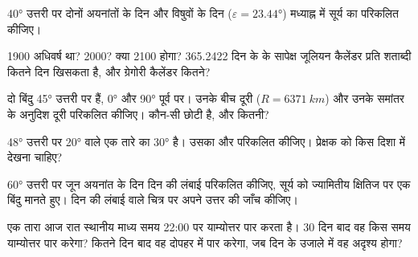 \begin{exercise}[$\star$]\label{exo:b1:spherical-astronomy:3}
\ang{40} उत्तरी  पर दोनों अयनांतों के दिन और विषुवों के दिन ($\varepsilon = \ang{23.44}$)
मध्याह्न में सूर्य का  परिकलित कीजिए।
\end{exercise}

\begin{exercise}[$\star$]\label{exo:b1:spherical-astronomy:4}
1900 अधिवर्ष था? 2000? क्या 2100 होगा? 365.2422 दिन के  के सापेक्ष जूलियन
कैलेंडर प्रति शताब्दी कितने दिन खिसकता है, और ग्रेगोरी कैलेंडर कितने?
\end{exercise}

\begin{exercise}[$\star\star$]\label{exo:b1:spherical-astronomy:5}
दो बिंदु \ang{45} उत्तरी  पर हैं,  \ang{0} और \ang{90} पूर्व पर। उनके बीच  दूरी
($R = \qty{6371}{km}$) और उनके समांतर के अनुदिश दूरी परिकलित कीजिए। कौन-सी छोटी है, और कितनी?
\end{exercise}

\begin{exercise}[$\star\star$]\label{exo:b1:spherical-astronomy:6}
\ang{48} उत्तरी  पर  \ang{20} वाले एक तारे का  \ang{30} है। उसका  और
 परिकलित कीजिए। प्रेक्षक को किस दिशा में देखना चाहिए?
\end{exercise}

\begin{exercise}[$\star\star$]\label{exo:b1:spherical-astronomy:7}
\ang{60} उत्तरी  पर जून अयनांत के दिन दिन की लंबाई परिकलित कीजिए, सूर्य को ज्यामितीय क्षितिज
पर एक बिंदु मानते हुए। दिन की लंबाई वाले चित्र पर अपने उत्तर की जाँच कीजिए।
\end{exercise}

\begin{exercise}[$\star\star$]\label{exo:b1:spherical-astronomy:8}
एक तारा आज रात स्थानीय माध्य समय 22:00 पर याम्योत्तर पार करता है। 30 दिन बाद वह किस समय
याम्योत्तर पार करेगा? कितने दिन बाद वह दोपहर में पार करेगा, जब दिन के उजाले में वह अदृश्य होगा?
\end{exercise}


